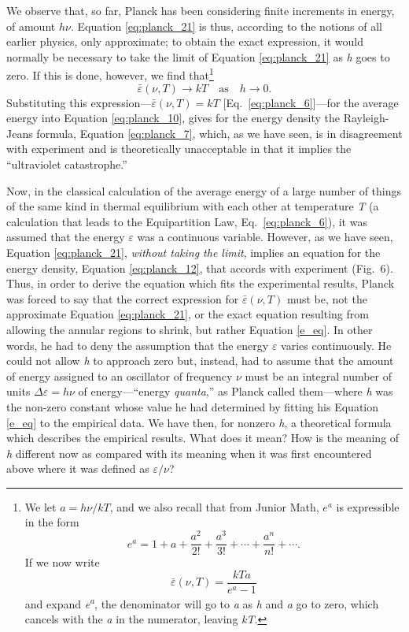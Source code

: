 We observe that, so far, Planck has been considering finite increments
in energy, of amount $h\nu$. Equation \eqref{eq:planck_21} is thus, according to the
notions of all earlier physics, only approximate; to obtain the exact
expression, it would normally be necessary to take the limit of Equation
\eqref{eq:planck_21} as \emph{h} goes to zero. If this is done, however, we find
that\footnote{We let $a = h\nu/kT$, and we also recall that from
  Junior Math, $e^a$ is expressible in the form
\begin{equation*}
e^a = 1 + a + \frac{a^2}{2!} + \frac{a^3}{3!} + \cdots + \frac{a^n}{n!} + \cdots.
\end{equation*}
  If we now write
\begin{equation*}
\bar{\varepsilon}(\nu, T) = \frac{kTa}{e^a - 1}
\end{equation*}
  and expand \emph{e\textsuperscript{a}}, the denominator will go to
  \emph{a} as \emph{h} and \emph{a} go to zero, which cancels with the
  \emph{a} in the numerator, leaving \emph{kT}.}
%
\begin{equation*}
\bar{\varepsilon}(\nu, T) \rightarrow kT\quad \text{as}\quad h \rightarrow 0.
\end{equation*}
%
Substituting this expression---$\bar{\varepsilon}(\nu, T) = kT$ 
{[}Eq.~\ref{eq:planck_6}{]}---for the average energy into Equation \eqref{eq:planck_10}, gives for the energy
density the Rayleigh-Jeans formula, Equation \eqref{eq:planck_7}, which, as we have seen,
is in disagreement with experiment and is theoretically unacceptable in
that it implies the ``ultraviolet catastrophe.''

Now, in the classical calculation of the average energy of a large
number of things of the same kind in thermal equilibrium with each other
at temperature \emph{T} (a calculation that leads to the Equipartition
Law, Eq.~\ref{eq:planck_6}), it was assumed that the energy $\varepsilon$ was a continuous
variable. However, as we have seen, Equation \eqref{eq:planck_21}, \emph{without taking
the limit}, implies an equation for the energy density, Equation \eqref{eq:planck_12},
that accords with experiment (Fig.\ 6). Thus, in order to derive the
equation which fits the experimental results, Planck was forced to say
that the correct expression for $\bar{\varepsilon}(\nu, T)$ must be, not the
approximate Equation \eqref{eq:planck_21}, or the exact equation resulting from allowing
the annular regions to shrink, but rather Equation \eqref{e_eq}. In other words,
he had to deny the assumption that the energy $\varepsilon$ varies
continuously. He could not allow \emph{h} to approach zero but, instead,
had to assume that the amount of energy assigned to an oscillator of
frequency $\nu$ must be an integral number of units $\Delta\varepsilon = h\nu$ of
energy---``energy \emph{quanta},'' as Planck called them---where
\emph{h} was the non-zero constant whose value he had determined by
fitting his Equation \eqref{e_eq} to the empirical data. We have then, for nonzero
\emph{h}, a theoretical formula which describes the empirical results.
What does it mean? How is the meaning of \emph{h} different now as
compared with its meaning when it was first encountered above where it
was defined as $\varepsilon/\nu$?

